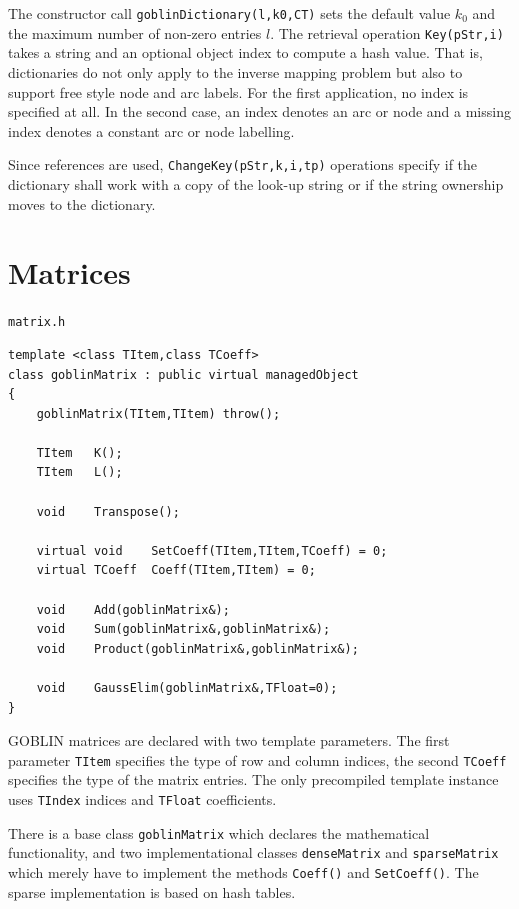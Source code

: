 \documentclass[a4paper,11pt,twoside]{book}
\begin{document}
\begin{multicols}{2}
The constructor call \verb/goblinDictionary(l,k0,CT)/ sets the default value
$k_0$ and the maximum number of non-zero entries $l$. The retrieval operation
\verb/Key(pStr,i)/ takes a string and an optional object index to compute
a hash value. That is, dictionaries do not only apply to the inverse mapping
problem but also to support free style node and arc labels. For the first
application, no index is specified at all. In the second case, an index denotes
an arc or node and a missing index denotes a constant arc or node labelling.

Since references are used, \verb/ChangeKey(pStr,k,i,tp)/ operations specify if
the dictionary shall work with a copy of the look-up string or if the string
ownership moves to the dictionary.



\section{Matrices}
\label{clb_matrix}
\myinclude\verb/matrix.h/
\begin{mymethods}
\begin{verbatim}
template <class TItem,class TCoeff>
class goblinMatrix : public virtual managedObject
{
    goblinMatrix(TItem,TItem) throw();

    TItem   K();
    TItem   L();

    void    Transpose();

    virtual void    SetCoeff(TItem,TItem,TCoeff) = 0;
    virtual TCoeff  Coeff(TItem,TItem) = 0;

    void    Add(goblinMatrix&);
    void    Sum(goblinMatrix&,goblinMatrix&);
    void    Product(goblinMatrix&,goblinMatrix&);

    void    GaussElim(goblinMatrix&,TFloat=0);
}
\end{verbatim}
\end{mymethods}
GOBLIN matrices are declared with two template parameters. The first parameter
\verb/TItem/ specifies the type of row and column indices, the second
\verb/TCoeff/ specifies the type of the matrix entries. The only precompiled
template instance uses \verb/TIndex/ indices and \verb/TFloat/ coefficients.

There is a base class \verb/goblinMatrix/ which declares the mathematical
functionality, and two implementational classes \verb/denseMatrix/ and
\verb/sparseMatrix/ which merely have to implement the methods \verb/Coeff()/
and \verb/SetCoeff()/. The sparse implementation is based on hash tables.


\end{multicols}
\end{document}
